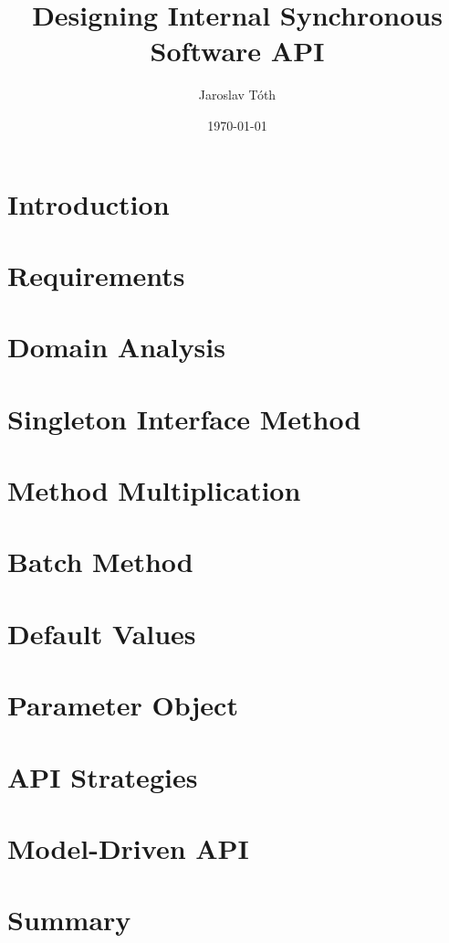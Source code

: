 \documentclass[11pt]{article}
\title{Designing Internal Synchronous Software API}
\author{Jaroslav Tóth}
\date{\today}
\begin{document}
\maketitle

\section{Introduction}
\label{sec:introduction}


\section{Requirements}
\label{sec:requirements}


\section{Domain Analysis}
\label{sec:domain}


\section{Singleton Interface Method}
\label{sec:singleton_interface_method}


\section{Method Multiplication}
\label{sec:method_multiplication}


\section{Batch Method}
\label{sec:batch_method}


\section{Default Values}
\label{sec:default_values}


\section{Parameter Object}
\label{sec:parameter_object}


\section{API Strategies}
\label{sec:api_strategies}


\section{Model-Driven API}
\label{sec:model_driven_api}


\section{Summary}
\label{sec:summary}


\newpage


\end{document}
